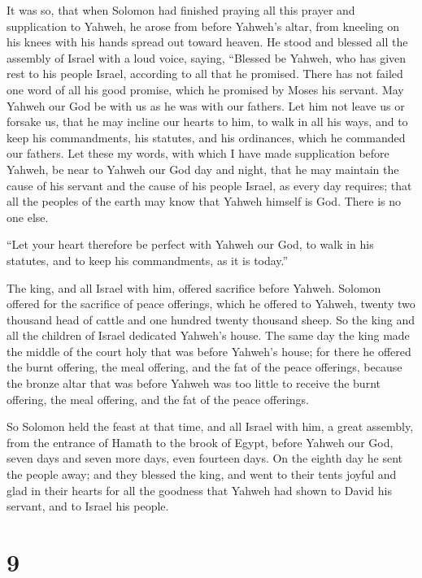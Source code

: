  It was so, that when Solomon had finished praying all this
prayer and supplication to Yahweh, he arose from before Yahweh's altar,
from kneeling on his knees with his hands spread out toward heaven.
 He stood and blessed all the assembly of Israel with a
loud voice, saying,  ``Blessed be Yahweh, who has given
rest to his people Israel, according to all that he promised. There has
not failed one word of all his good promise, which he promised by Moses
his servant.  May Yahweh our God be with us as he was with
our fathers. Let him not leave us or forsake us,  that he
may incline our hearts to him, to walk in all his ways, and to keep his
commandments, his statutes, and his ordinances, which he commanded our
fathers.  Let these my words, with which I have made
supplication before Yahweh, be near to Yahweh our God day and night,
that he may maintain the cause of his servant and the cause of his
people Israel, as every day requires;  that all the peoples
of the earth may know that Yahweh himself is God. There is no one else.

 ``Let your heart therefore be perfect with Yahweh our God,
to walk in his statutes, and to keep his commandments, as it is today.''

 The king, and all Israel with him, offered sacrifice
before Yahweh.  Solomon offered for the sacrifice of peace
offerings, which he offered to Yahweh, twenty two thousand head of
cattle and one hundred twenty thousand sheep. So the king and all the
children of Israel dedicated Yahweh's house.  The same day
the king made the middle of the court holy that was before Yahweh's
house; for there he offered the burnt offering, the meal offering, and
the fat of the peace offerings, because the bronze altar that was before
Yahweh was too little to receive the burnt offering, the meal offering,
and the fat of the peace offerings.

 So Solomon held the feast at that time, and all Israel
with him, a great assembly, from the entrance of Hamath to the brook of
Egypt, before Yahweh our God, seven days and seven more days, even
fourteen days.  On the eighth day he sent the people away;
and they blessed the king, and went to their tents joyful and glad in
their hearts for all the goodness that Yahweh had shown to David his
servant, and to Israel his people.

\hypertarget{section-8}{%
\section{9}\label{section-8}}

